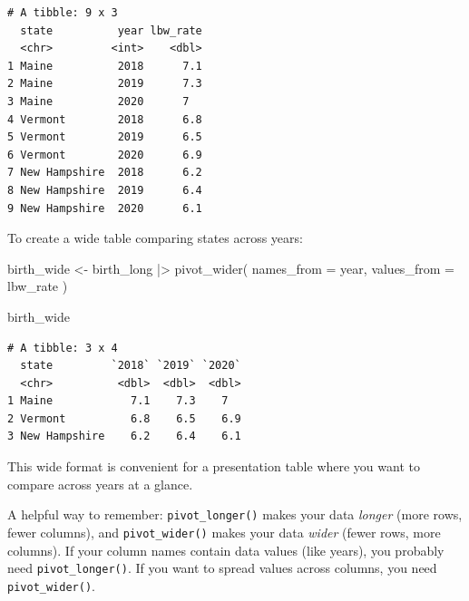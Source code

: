 \documentclass[
  letterpaper,
  DIV=11,
  numbers=noendperiod]{scrreprt}
\newenvironment{Shaded}{\begin{snugshade}}{\end{snugshade}}
\newcommand{\AttributeTok}[1]{\textcolor[rgb]{0.40,0.45,0.13}{#1}}
\newcommand{\FunctionTok}[1]{\textcolor[rgb]{0.28,0.35,0.67}{#1}}
\newcommand{\NormalTok}[1]{\textcolor[rgb]{0.00,0.23,0.31}{#1}}
\newcommand{\OtherTok}[1]{\textcolor[rgb]{0.00,0.23,0.31}{#1}}
\newcommand{\SpecialCharTok}[1]{\textcolor[rgb]{0.37,0.37,0.37}{#1}}
\begin{document}
\begin{verbatim}
# A tibble: 9 x 3
  state          year lbw_rate
  <chr>         <int>    <dbl>
1 Maine          2018      7.1
2 Maine          2019      7.3
3 Maine          2020      7  
4 Vermont        2018      6.8
5 Vermont        2019      6.5
6 Vermont        2020      6.9
7 New Hampshire  2018      6.2
8 New Hampshire  2019      6.4
9 New Hampshire  2020      6.1
\end{verbatim}

To create a wide table comparing states across years:

\begin{Shaded}
\begin{Highlighting}[]
\NormalTok{birth\_wide }\OtherTok{\textless{}{-}}\NormalTok{ birth\_long }\SpecialCharTok{|\textgreater{}}
  \FunctionTok{pivot\_wider}\NormalTok{(}
    \AttributeTok{names\_from =}\NormalTok{ year,}
    \AttributeTok{values\_from =}\NormalTok{ lbw\_rate}
\NormalTok{  )}

\NormalTok{birth\_wide}
\end{Highlighting}
\end{Shaded}

\begin{verbatim}
# A tibble: 3 x 4
  state         `2018` `2019` `2020`
  <chr>          <dbl>  <dbl>  <dbl>
1 Maine            7.1    7.3    7  
2 Vermont          6.8    6.5    6.9
3 New Hampshire    6.2    6.4    6.1
\end{verbatim}

This wide format is convenient for a presentation table where you want
to compare across years at a glance.

\begin{tcolorbox}[enhanced jigsaw, arc=.35mm, bottomrule=.15mm, bottomtitle=1mm, breakable, colback=white, colbacktitle=quarto-callout-note-color!10!white, colframe=quarto-callout-note-color-frame, coltitle=black, left=2mm, leftrule=.75mm, opacityback=0, opacitybacktitle=0.6, rightrule=.15mm, title=\textcolor{quarto-callout-note-color}{\faInfo}\hspace{0.5em}{Remembering the Difference}, titlerule=0mm, toprule=.15mm, toptitle=1mm]

A helpful way to remember: \texttt{pivot\_longer()} makes your data
\emph{longer} (more rows, fewer columns), and \texttt{pivot\_wider()}
makes your data \emph{wider} (fewer rows, more columns). If your column
names contain data values (like years), you probably need
\texttt{pivot\_longer()}. If you want to spread values across columns,
you need \texttt{pivot\_wider()}.

\end{tcolorbox}
\end{document}
